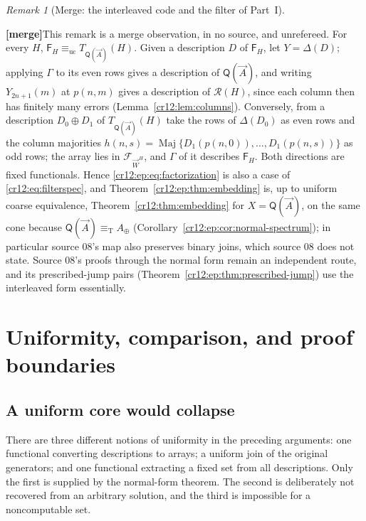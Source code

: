 \documentclass[11pt,letterpaper]{article}
\theoremstyle{plain}
\theoremstyle{definition}
\theoremstyle{remark}
\newtheorem{remark}[theorem]{Remark}
\numberwithin{equation}{section}
\newcommand{\eqT}{\equiv_{\mathrm T}}
\newcommand{\equc}{\equiv_{\mathrm{uc}}}
\newcommand{\Rcode}{\mathcal R}
\newcommand{\mergenote}[1]{\par\smallskip\noindent
 {\small\textsf{\textbf{[merge]}}\enspace #1}\par\smallskip}
\newcommand{\Aplus}{A_{\oplus}}          %
\newcommand{\QQ}{\mathsf Q}              %
\newcommand{\Fint}{\mathsf F}            %
\newcommand{\FF}{\mathcal F}             %
\newcommand{\WW}{\vec W}                 %
\begin{document}
\begin{remark}[Merge: the interleaved code and the filter of Part~I]\label{cr12:ep:rem:filtercompare}
\mergenote{This remark is a merge observation, in no source, and unrefereed. For every
$H$, $\Fint_H\equc T_{\QQ(\vec A)}(H)$. Given a description $D$ of $\Fint_H$, let
$Y=\Delta(D)$; applying $\Gamma$ to its even rows gives a description of
$\QQ(\vec A)$, and writing $Y_{2n+1}(m)$ at $p(n,m)$ gives a description of $\Rcode(H)$,
since each column then has finitely many errors (Lemma~\ref{cr12:lem:columns}).
Conversely, from a description $D_0\oplus D_1$ of $T_{\QQ(\vec A)}(H)$ take the rows of
$\Delta(D_0)$ as even rows and the column majorities
$h(n,s)=\operatorname{Maj}\{D_1(p(n,0)),\dots,D_1(p(n,s))\}$ as odd rows; the array
lies in $\FF_{\WW^H}$, and $\Gamma$ of it describes $\Fint_H$. Both directions are fixed
functionals. Hence \eqref{cr12:ep:eq:factorization} is also a case of
\eqref{cr12:eq:filterspec}, and Theorem~\ref{cr12:ep:thm:embedding} is, up to uniform
coarse equivalence, Theorem~\ref{cr12:thm:embedding} for $X=\QQ(\vec A)$, on the same
cone because $\QQ(\vec A)\eqT\Aplus$ (Corollary~\ref{cr12:ep:cor:normal-spectrum});
in particular source 08's map also preserves
binary joins, which source 08 does not state. Source 08's proofs through the normal
form remain an independent route, and its prescribed-jump pairs
(Theorem~\ref{cr12:ep:thm:prescribed-jump}) use the interleaved form essentially.}
\end{remark}

\section{Uniformity, comparison, and proof boundaries}\label{cr12:ep:sec:audit}
\subsection{A uniform core would collapse}
There are three different notions of uniformity in the preceding arguments: one
functional converting descriptions to arrays; a uniform join of the original
generators; and one functional extracting a fixed set from all descriptions. Only
the first is supplied by the normal-form theorem. The second is deliberately not
recovered from an arbitrary solution, and the third is impossible for a
noncomputable set.
\end{document}
